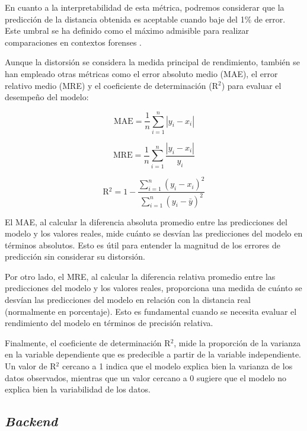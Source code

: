 En cuanto a la interpretabilidad de esta métrica, podremos considerar que la predicción de la distancia obtenida es aceptable cuando baje del 1\% de error. Este umbral se ha definido como el máximo admisible para realizar comparaciones en contextos forenses \cite{55}.

Aunque la distorsión se considera la medida principal de rendimiento, también se han empleado otras métricas como el error absoluto medio (MAE), el error relativo medio (MRE) y el coeficiente de determinación (R$^2$) para evaluar el desempeño del modelo:

\begin{equation}
	\text{MAE} = \frac{1}{n} \sum_{i=1}^{n} | y_i - x_i |
\end{equation}

\begin{equation}
	\text{MRE} = \frac{1}{n} \sum_{i=1}^{n} \frac{| y_i - x_i |}{y_i}
\end{equation}

\begin{equation}
	\text{R$^2$} = 1 - \frac{\sum_{i=1}^{n} (y_i - x_i)^2}{\sum_{i=1}^{n} (y_i - \bar{y})^2}
\end{equation}

El MAE, al calcular la diferencia absoluta promedio entre las predicciones del modelo y los valores reales, mide cuánto se desvían las predicciones del modelo en términos absolutos. Esto es útil para entender la magnitud de los errores de predicción sin considerar su distorsión.

Por otro lado, el MRE, al calcular la diferencia relativa promedio entre las predicciones del modelo y los valores reales, proporciona una medida de cuánto se desvían las predicciones del modelo en relación con la distancia real (normalmente en porcentaje). Esto es fundamental cuando se necesita evaluar el rendimiento del modelo en términos de precisión relativa.

Finalmente, el coeficiente de determinación R$^2$, mide la proporción de la varianza en la variable dependiente que es predecible a partir de la variable independiente. Un valor de R$^2$ cercano a 1 indica que el modelo explica bien la varianza de los datos observados, mientras que un valor cercano a 0 sugiere que el modelo no explica bien la variabilidad de los datos.

\subsection{\textit{Backend}}\label{backend}

